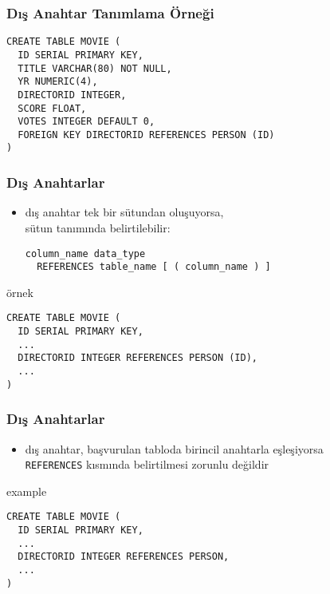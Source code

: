\documentclass[dvipsnames]{beamer}
\theoremstyle{plain}
\begin{document}
\begin{frame}[fragile]
  \frametitle{Dış Anahtar Tanımlama Örneği}

  \begin{lstlisting}
CREATE TABLE MOVIE (
  ID SERIAL PRIMARY KEY,
  TITLE VARCHAR(80) NOT NULL,
  YR NUMERIC(4),
  DIRECTORID INTEGER,
  SCORE FLOAT,
  VOTES INTEGER DEFAULT 0,
  FOREIGN KEY DIRECTORID REFERENCES PERSON (ID)
)
  \end{lstlisting}
\end{frame}

\begin{frame}[fragile]
  \frametitle{Dış Anahtarlar}

  \begin{itemize}
    \item dış anahtar tek bir sütundan oluşuyorsa,\\
       sütun tanımında belirtilebilir:
    \begin{lstlisting}
column_name data_type
  REFERENCES table_name [ ( column_name ) ]
    \end{lstlisting}
  \end{itemize}

  \begin{exampleblock}{örnek}
    \begin{lstlisting}
CREATE TABLE MOVIE (
  ID SERIAL PRIMARY KEY,
  ...
  DIRECTORID INTEGER REFERENCES PERSON (ID),
  ...
)
    \end{lstlisting}
  \end{exampleblock}
\end{frame}

\begin{frame}[fragile]
  \frametitle{Dış Anahtarlar}

  \begin{itemize}
    \item dış anahtar, başvurulan tabloda birincil anahtarla eşleşiyorsa\\
       \texttt{REFERENCES} kısmında belirtilmesi zorunlu değildir
  \end{itemize}

  \begin{exampleblock}{example}
    \begin{lstlisting}
CREATE TABLE MOVIE (
  ID SERIAL PRIMARY KEY,
  ...
  DIRECTORID INTEGER REFERENCES PERSON,
  ...
)
    \end{lstlisting}
  \end{exampleblock}
\end{frame}
\end{document}
